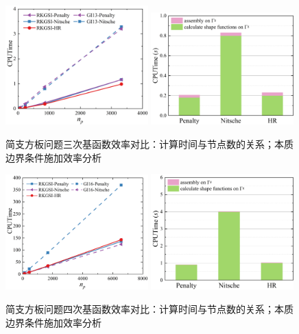 \begin{figure}[H]
    \centering
    \begin{subcaptiongroup}
    \includegraphics[width=0.49\textwidth]{figure/PHR/R/Ccputime.png}
    \label{Ccputime}
    \includegraphics[width=0.49\textwidth]{figure/PHR/R/Cefficiency.png}
    \label{Cefficiency}
    \end{subcaptiongroup}
\caption{简支方板问题三次基函数效率对比：计算时间与节点数的关系；本质边界条件施加效率分析}
\label{RCcputime}
\end{figure}
\newpage
\begin{figure}[H]
    \centering
    \begin{subcaptiongroup}
    \includegraphics[width=0.49\textwidth]{figure/PHR/R/Qcputime.png}
    \label{Qcputime}
    \includegraphics[width=0.49\textwidth]{figure/PHR/R/Qefficiency.png}
    \label{Qefficiency}
    \end{subcaptiongroup}
\caption{简支方板问题四次基函数效率对比：计算时间与节点数的关系；本质边界条件施加效率分析}
\label{RQcputime}
\end{figure}
